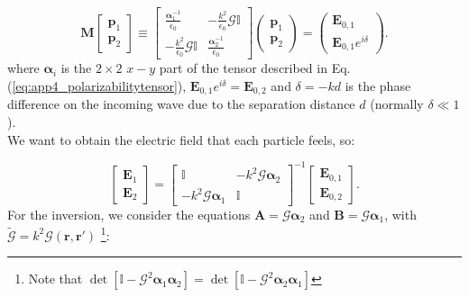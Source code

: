 \begin{equation}
\mathbf{M}\left[\begin{array}{c}
\mathbf{p}_{1}\\
\mathbf{p}_{2}
\end{array}\right]\equiv\left[\begin{array}{cc}
\frac{\boldsymbol{\alpha}_{1}^{-1}}{\epsilon_{0}} & -\frac{k^2}{\epsilon_{0}}\mathcal{G}\mathbb{I}\\
-\frac{k^2}{\epsilon_{0}}\mathcal{G}\mathbb{I} & \frac{\boldsymbol{\alpha}_{2}^{-1}}{\epsilon_0}
\end{array}\right]\left(\begin{array}{c}
\mathbf{p}_{1}\\
\mathbf{p}_{2}
\end{array}\right)=\left(\begin{array}{c}
\mathbf{E}_{0,1}\\
\mathbf{E}_{0,1}e^{i\delta}
\end{array}\right).
\end{equation}
where $\boldsymbol{\alpha}_i$ is the $2\times2$ $x-y$ part of the tensor described in Eq. (\ref{eq:app4_polarizabilitytensor}), $\mathbf{E}_{0,1}e^{i\delta} = \mathbf{E}_{0,2}$ and $\delta = -kd$ is the phase difference on the incoming wave due to the separation distance $d$ (normally $\delta \ll 1$).\\
We want to obtain the electric field that each particle feels, so:

\begin{equation}
\begin{bmatrix}\mathbf{E}_{1}\\
\mathbf{E}_{2}
\end{bmatrix}=\begin{bmatrix}\mathbb{I} & -k^2\mathcal{G}\boldsymbol{\alpha}_{2}\\
-k^{2}\mathcal{G}\boldsymbol{\alpha}_{1} & \mathbb{I}
\end{bmatrix}^{-1}\left[\begin{array}{c}
\mathbf{E}_{0,1}\\
\mathbf{E}_{0,2}
\end{array}\right].\label{Eq:app_D10}
\end{equation}
For the inversion, we consider the equations $\mathbf{A}=\mathcal{G}\boldsymbol{\alpha}_{2}$
and \textbf{$\mathbf{B}=\mathcal{G}\boldsymbol{\alpha}_{1}$}, with
$\tilde{\mathcal{G}}=k^{2}\mathcal{G}\left(\mathbf{r},\mathbf{r}'\right)$
\footnote{Note that $\det\left[\mathbb{I}-\mathcal{G}^{2}\boldsymbol{\alpha}_{1}\boldsymbol{\alpha}_{2}\right]=\det\left[\mathbb{I}-\mathcal{G}^{2}\boldsymbol{\alpha}_{2}\boldsymbol{\alpha}_{1}\right]$}:

